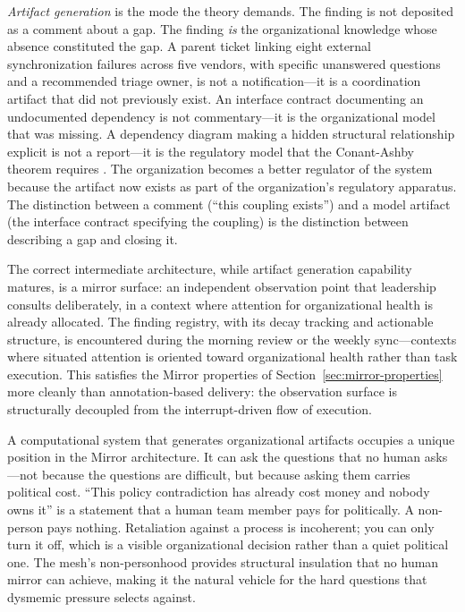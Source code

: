 \documentclass[11pt,a4paper]{article}
\begin{document}
\emph{Artifact generation} is the mode the theory demands. The finding is not deposited as a comment about a gap. The finding \emph{is} the organizational knowledge whose absence constituted the gap. A parent ticket linking eight external synchronization failures across five vendors, with specific unanswered questions and a recommended triage owner, is not a notification---it is a coordination artifact that did not previously exist. An interface contract documenting an undocumented dependency is not commentary---it is the organizational model that was missing. A dependency diagram making a hidden structural relationship explicit is not a report---it is the regulatory model that the Conant-Ashby theorem requires \citep{conant1970}. The organization becomes a better regulator of the system because the artifact now exists as part of the organization's regulatory apparatus. The distinction between a comment (``this coupling exists'') and a model artifact (the interface contract specifying the coupling) is the distinction between describing a gap and closing it.

The correct intermediate architecture, while artifact generation capability matures, is a mirror surface: an independent observation point that leadership consults deliberately, in a context where attention for organizational health is already allocated. The finding registry, with its decay tracking and actionable structure, is encountered during the morning review or the weekly sync---contexts where situated attention is oriented toward organizational health rather than task execution. This satisfies the Mirror properties of Section~\ref{sec:mirror-properties} more cleanly than annotation-based delivery: the observation surface is structurally decoupled from the interrupt-driven flow of execution.

A computational system that generates organizational artifacts occupies a unique position in the Mirror architecture. It can ask the questions that no human asks---not because the questions are difficult, but because asking them carries political cost. ``This policy contradiction has already cost money and nobody owns it'' is a statement that a human team member pays for politically. A non-person pays nothing. Retaliation against a process is incoherent; you can only turn it off, which is a visible organizational decision rather than a quiet political one. The mesh's non-personhood provides structural insulation that no human mirror can achieve, making it the natural vehicle for the hard questions that dysmemic pressure selects against.
\end{document}

